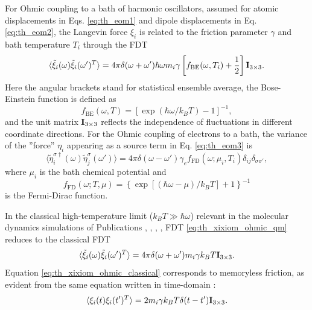 For Ohmic coupling to a bath of harmonic oscillators, assumed for atomic displacements in Eqs. \eqref{eq:th_eom1} and dipole displacements in Eq. \eqref{eq:th_eom2}, the Langevin force $\xi_i$ is related to the friction parameter $\gamma$ and bath temperature $T_i$ through the FDT \cite{weiss,dhar06}
\begin{equation}
 \langle \tilde \xi_i(\omega) \tilde \xi_i(\omega')^T \rangle = 4\pi \delta(\omega+\omega') \hbar \omega m_i \gamma \left[f_{\textrm{BE}}(\omega,T_i)+ \frac{1}{2} \right] \mathbf{I}_{3\times 3}. \label{eq:th_xixiom_ohmic_qm}
\end{equation}
Here the angular brackets stand for statistical ensemble average, the Bose-Einstein function is defined as
\begin{equation}
 f_{\textrm{BE}}(\omega,T)=\left[\exp(\hbar \omega/k_BT)-1\right]^{-1}, \label{eq:th_fBE}
\end{equation}
and the unit matrix $\mathbf{I}_{3 \times 3}$ reflects the independence of fluctuations in different coordinate directions. For the Ohmic coupling of electrons to a bath, the variance of the ''force'' $\eta_i$ appearing as a source term in Eq. \eqref{eq:th_eom3} is \cite{dhar03,dhar06b,roy07}
\begin{equation}
 \langle \tilde \eta_{i}^{\sigma\dagger}(\omega) \tilde \eta_{j}^{\sigma}(\omega') \rangle = 4\pi\delta(\omega-\omega') \gamma_e f_{\textrm{FD}}(\omega;\mu_{i},T_{i}) \delta_{ij}\delta_{\sigma\sigma'}, \label{eq:th_etaetaom}
\end{equation}
where $\mu_i$ is the bath chemical potential and 
\begin{equation}
 f_{\textrm{FD}}(\omega;T,\mu)=\left\{\exp\left[(\hbar \omega-\mu)/k_BT\right]+1\right\}^{-1}
\end{equation}
is the Fermi-Dirac function.


In the classical high-temperature limit ($k_B T \gg \hbar \omega$) relevant in the molecular dynamics simulations of Publications , , , , FDT \eqref{eq:th_xixiom_ohmic_qm} reduces to the classical FDT
\begin{equation}
 \langle \tilde \xi_i(\omega) \tilde \xi_i(\omega')^T \rangle = 4\pi \delta(\omega+\omega') m_i \gamma k_B T  \mathbf{I}_{3\times 3}. \label{eq:th_xixiom_ohmic_classical}
\end{equation}
Equation \eqref{eq:th_xixiom_ohmic_classical} corresponds to memoryless friction, as evident from the same equation written in time-domain \cite{zwanzig}:
\begin{equation}
 \langle \xi_i(t)  \xi_i(t')^T \rangle = 2 m_i \gamma k_B T \delta(t-t') \mathbf{I}_{3\times 3}. \label{eq:th_xixit_ohmic_classical}
\end{equation}

